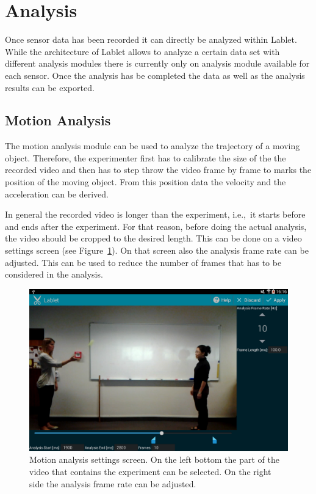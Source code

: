 \documentclass{sigchi}
\newcommand{\ie}{i.e.,\ }
\begin{document}
\section{Analysis}
Once sensor data has been recorded it can directly be analyzed within
Lablet.  While the architecture of Lablet allows to analyze a certain
data set with different analysis modules there is currently only on
analysis module available for each sensor.  Once the analysis has be
completed the data as well as the analysis results can be exported.

\subsection{Motion Analysis}
The motion analysis module can be used to analyze the trajectory of a
moving object.  Therefore, the experimenter first has to calibrate the
size of the the recorded video and then has to step throw the video
frame by frame to marks the position of the moving object.  From this
position data the velocity and the acceleration can be derived.

In general the recorded video is longer than the experiment, \ie it
starts before and ends after the experiment.  For that reason, before
doing the actual analysis, the video should be cropped to the desired
length.  This can be done on a video settings screen (see
Figure~\ref{fig:MotionAnalysisSettingsScreen}).  On that screen also
the analysis frame rate can be adjusted.  This can be used to reduce
the number of frames that has to be considered in the analysis.

\begin{figure}
  \centering
  \includegraphics[width=.99\columnwidth]{MotionAnalysisSettings}
  \caption{Motion analysis settings screen.  On the left bottom the
    part of the video that contains the experiment can be selected.
    On the right side the analysis frame rate can be
    adjusted.\label{fig:MotionAnalysisSettingsScreen} }
\end{figure}
\end{document}
